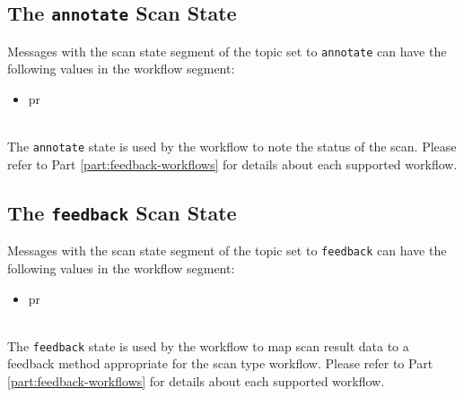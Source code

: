 \subsection{The \texttt{annotate} Scan State}

Messages with the scan state segment of the topic set to \texttt{annotate} can have the following
values in the workflow segment:

\begin{itemize}
    \item pr
\end{itemize}

\noindent\\The \texttt{annotate} state is used by the workflow to note the status of the
scan.  Please refer to Part \ref{part:feedback-workflows} for details about each supported
workflow.


\subsection{The \texttt{feedback} Scan State}

Messages with the scan state segment of the topic set to \texttt{feedback} can have the following
values in the workflow segment:

\begin{itemize}
    \item pr
\end{itemize}

\noindent\\The \texttt{feedback} state is used by the workflow to map scan result data to
a feedback method appropriate for the scan type workflow.  
Please refer to Part \ref{part:feedback-workflows} for details about each supported workflow.

